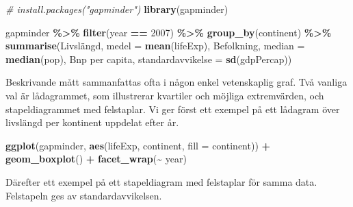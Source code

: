 \documentclass[
]{book}
\newenvironment{Shaded}{\begin{snugshade}}{\end{snugshade}}
\newcommand{\AttributeTok}[1]{\textcolor[rgb]{0.13,0.29,0.53}{#1}}
\newcommand{\CommentTok}[1]{\textcolor[rgb]{0.56,0.35,0.01}{\textit{#1}}}
\newcommand{\DecValTok}[1]{\textcolor[rgb]{0.00,0.00,0.81}{#1}}
\newcommand{\FunctionTok}[1]{\textcolor[rgb]{0.13,0.29,0.53}{\textbf{#1}}}
\newcommand{\NormalTok}[1]{#1}
\newcommand{\OtherTok}[1]{\textcolor[rgb]{0.56,0.35,0.01}{#1}}
\newcommand{\SpecialCharTok}[1]{\textcolor[rgb]{0.81,0.36,0.00}{\textbf{#1}}}
\newcommand{\StringTok}[1]{\textcolor[rgb]{0.31,0.60,0.02}{#1}}
\theoremstyle{definition}
\theoremstyle{definition}
\theoremstyle{definition}
\theoremstyle{definition}
\theoremstyle{remark}
\begin{document}
\begin{Shaded}
\begin{Highlighting}[]
\CommentTok{\# install.packages("gapminder")}
\FunctionTok{library}\NormalTok{(gapminder)}

\NormalTok{gapminder }\SpecialCharTok{\%\textgreater{}\%} 
  \FunctionTok{filter}\NormalTok{(year }\SpecialCharTok{==} \DecValTok{2007}\NormalTok{) }\SpecialCharTok{\%\textgreater{}\%} 
  \FunctionTok{group\_by}\NormalTok{(continent) }\SpecialCharTok{\%\textgreater{}\%} 
  \FunctionTok{summarise}\NormalTok{(}\StringTok{\textasciigrave{}}\AttributeTok{Livslängd, medel}\StringTok{\textasciigrave{}} \OtherTok{=} \FunctionTok{mean}\NormalTok{(lifeExp),}
            \StringTok{\textasciigrave{}}\AttributeTok{Befolkning, median}\StringTok{\textasciigrave{}} \OtherTok{=} \FunctionTok{median}\NormalTok{(pop),}
            \StringTok{\textasciigrave{}}\AttributeTok{Bnp per capita, standardavvikelse}\StringTok{\textasciigrave{}} \OtherTok{=} \FunctionTok{sd}\NormalTok{(gdpPercap))}
\end{Highlighting}
\end{Shaded}

Beskrivande mått sammanfattas ofta i någon enkel vetenskaplig graf. Två vanliga val är lådagrammet, som illustrerar kvartiler och möjliga extremvärden, och stapeldiagrammet med felstaplar. Vi ger först ett exempel på ett lådagram över livslängd per kontinent uppdelat efter år.

\begin{Shaded}
\begin{Highlighting}[]
\FunctionTok{ggplot}\NormalTok{(gapminder, }\FunctionTok{aes}\NormalTok{(lifeExp, continent, }\AttributeTok{fill =}\NormalTok{ continent)) }\SpecialCharTok{+}
  \FunctionTok{geom\_boxplot}\NormalTok{() }\SpecialCharTok{+}
  \FunctionTok{facet\_wrap}\NormalTok{(}\SpecialCharTok{\textasciitilde{}}\NormalTok{ year)}
\end{Highlighting}
\end{Shaded}

Därefter ett exempel på ett stapeldiagram med felstaplar för samma data. Felstapeln ges av standardavvikelsen.
\end{document}
